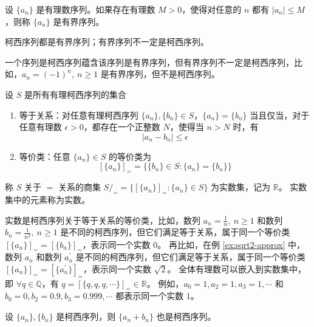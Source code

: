 \begin{definition}
    设 $\{a_n\}$ 是有理数序列。如果存在有理数 $M>0$，使得对任意的 $n$ 都有 $|a_n|\le M$，则称 $\{a_n\}$ 是有界序列。
\end{definition}

\begin{theorem}
    柯西序列都是有界序列；有界序列不一定是柯西序列。
\end{theorem}

\begin{note}
    一个序列是柯西序列蕴含该序列是有界序列，但有界序列不一定是柯西序列，比如，$a_n=(-1)^n,\ n\ge 1$ 是有界序列，但不是柯西序列。
\end{note}
\vspace{1em}

\begin{definition} 
    设 $S$ 是所有有理柯西序列的集合
    \begin{enumerate}
        \item 等于关系：对任意有理柯西序列 $\{a_n\},\{b_n\}\in S$，$\{a_n\} = \{b_n\}$ 当且仅当，对于任意有理数 $\epsilon>0$，都存在一个正整数 $N$，使得当 $n>N$ 时，有
        \[
            |a_n - b_n| \le \epsilon
        \] 
        \item 等价类：任意 $\{a_n\}\in S$ 的等价类为
        \[
            [\{a_n\}]_{=} = \{\{b_n\}\in S : \{a_n\} = \{b_n\}\}
        \]
    \end{enumerate}
    称 $S$ 关于 $=$ 关系的商集 $S/_{=}= \{[\{a_n\}]_{=} : \{a_n\}\in S\}$ 为实数集，记为 $\mathbb{R}$。
    实数集中的元素称为实数。
\end{definition}
\begin{note}
    实数是柯西序列关于等于关系的等价类，比如，数列 $a_n = \frac{1}{n},\ n\ge 1$ 和数列 $b_n = \frac{1}{n^2},\ n\ge 1$ 是不同的柯西序列，但它们满足等于关系，属于同一个等价类 $[\{a_n\}]_{=}=[\{b_n\}]_{=}$，表示同一个实数 $0$。
    再比如，在例 \ref{ex:sqrt2-approx} 中，数列 $a_n$ 和数列 $a_n^{\prime}$ 是不同的柯西序列，但它们满足等于关系，属于同一个等价类 $[\{a_n\}]_{=}=[\{a_n^{\prime}\}]_{=}$，表示同一个实数 $\sqrt{2}$。
    全体有理数可以嵌入到实数集中，即 $\forall q\in\mathbb{Q}$，有 $q = [\{q,q,q,\cdots\}]_{=}\in\mathbb{R}$。
    例如，$a_0=1,a_2=1,a_3=1,\cdots$ 和 $b_0=0,b_2=0.9,b_3=0.999,\cdots$ 都表示同一个实数 $1$。
\end{note}
\vspace{1em}

\begin{lemma}
    设 $\{a_n\},\{b_n\}$ 是柯西序列，则 $\{a_n+b_n\}$ 也是柯西序列。
\end{lemma}

